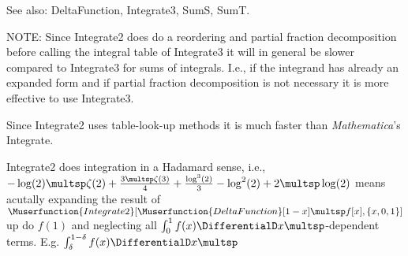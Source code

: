 See also:  DeltaFunction, Integrate3, SumS, SumT.

NOTE: Since Integrate2 does do a reordering and partial fraction decomposition before calling the integral table of Integrate3 it will in
  general be slower compared to Integrate3 for sums of integrals. I.e., if the integrand has already an expanded form and if partial
  fraction decomposition is not necessary it is more effective to use Integrate3.




Since Integrate2 uses table-look-up methods it is much faster than {\itshape Mathematica}'s Integrate.









Integrate2 does integration in a Hadamard sense, i.e., \(-\log(2)\multsp \zeta (2)+\frac{3\multsp \zeta (3)}{4}+\frac{{{\log}^3}(2)}{3}-{{\log}^2}(2)+2\multsp
\log(2)\) means acutally expanding the result of \(\Muserfunction{Integrate2}[\Muserfunction{DeltaFunction}[1-x]\multsp f[x],\{x,0,1\}]\)up do \(f(1)\)
and neglecting all \(\int _{0}^{1}f(x)\DifferentialD x\multsp \)-dependent terms. E.g. \(\int _{\delta }^{1-\delta }f(x)\DifferentialD x\multsp \)


